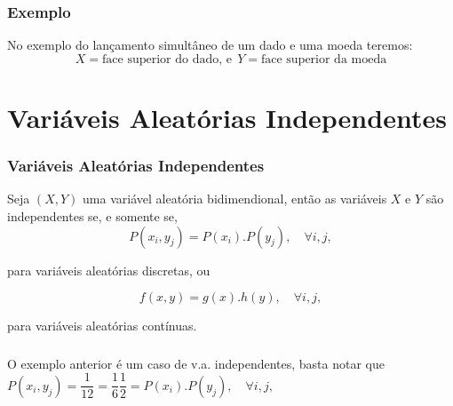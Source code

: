 \documentclass[14pt,aspectratio=1610]{beamer}
\begin{document}
\begin{frame}{}
\frametitle{Exemplo}
\begin{block}{}
No exemplo do lançamento simultâneo de um dado e uma moeda teremos:
$$X= \textrm{face superior do dado,\ e}\ \ Y=\textrm{face superior da moeda}$$
\begin{table}[h]
\centering
{}
\end{table}
\end{block}
\end{frame}

\section{Variáveis Aleatórias Independentes}
\begin{frame}{}
\frametitle{Variáveis Aleatórias Independentes}
\begin{block}{}
\justifying
Seja $(X, Y)$ uma variável aleatória bidimendional, então as variáveis $X$ e $Y$
são independentes se, e somente se, 
$$P(x_{i}, y_{j}) = P(x_{i}).P (y_{j}),\quad \forall i,j,$$

para variáveis aleatórias discretas, ou 

$$f(x, y) = g(x).h(y),\quad \forall i,j,$$

para variáveis aleatórias contínuas. 

\end{block}
\end{frame}

\begin{frame}{}
\frametitle{}
\begin{block}{}
\justifying
O exemplo anterior é um caso de v.a. independentes, basta notar que 
$P(x_{i}, y_{j}) =\dfrac{1}{12}= \dfrac{1}{6}\dfrac{1}{2}=P(x_{i}).P (y_{j}),\quad \forall i,j,$
\end{block}
\end{frame}
\end{document}
